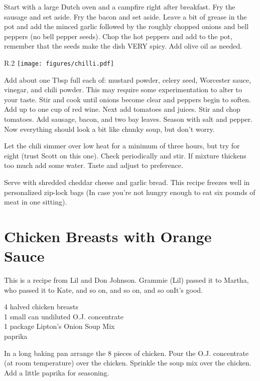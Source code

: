 Start with a large Dutch oven and a campfire right after breakfast.  Fry the
sausage and set aside.  Fry the bacon and set aside.  Leave a bit of grease in
the pot and add the minced garlic followed by the roughly chopped onions and
bell peppers (no bell pepper seeds).  Chop the hot peppers and add to the pot,
remember that the seeds make the dish VERY spicy.  Add olive oil as needed.
\begin{wrapfigure}{R}{.2\textwidth}
\centering
\texttt{[image: figures/chilli.pdf]}
\end{wrapfigure}
Add about one Tbsp full each of: mustard powder, celery seed, Worcester sauce,
vinegar, and chili powder.  This may require some experimentation to alter to
your taste.  Stir and cook until onions become clear and peppers begin to
soften.  Add up to one cup of red wine.  Next add tomatoes and juices.  Stir
and chop tomatoes.  Add sausage, bacon, and two bay leaves.  Season with salt
and pepper.  Now everything should look a bit like chunky soup, but don't
worry.

Let the chili simmer over low heat for a minimum of three hours, but try for
eight (trust Scott on this one). Check periodically and stir.  If mixture
thickens too much add some water.  Taste and adjust to preference.

Serve with shredded cheddar cheese and garlic bread.  This recipe freezes well
in personalized zip-lock bags (In case you're not hungry enough to eat six
pounds of meat in one sitting).

\section{Chicken Breasts with Orange Sauce
}

\begin{open}
  This is a recipe from Lil and Don Johnson.  Grammie (Lil) passed it to Martha, who passed it to Kate, and so on, and so on, and so on\textellipsis It's good.
\end{open}
\begin{ingredients}
  4 halved chicken breasts \\
  1 small can undiluted O.J. concentrate \\
  1 package Lipton's Onion Soup Mix \\
  paprika
\end{ingredients}
In a long baking pan arrange the 8 pieces of chicken.  Pour the O.J.
concentrate (at room temperature) over the chicken.  Sprinkle the soup mix
over the chicken.  Add a little paprika for seasoning.

